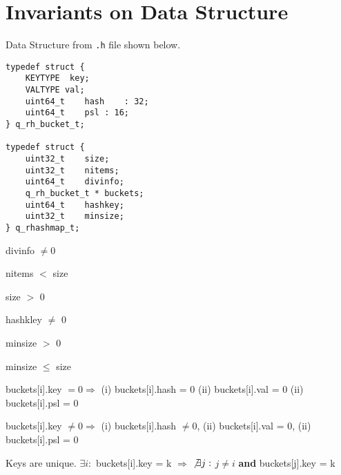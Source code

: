 \section{Invariants on Data Structure}
\label{invariants}
Data Structure from {\tt .h} file shown below.
\begin{verbatim}
typedef struct {
	KEYTYPE  key; 
	VALTYPE val;
	uint64_t	hash	: 32;
	uint64_t	psl	: 16;
} q_rh_bucket_t;

typedef struct {
	uint32_t	size;
	uint32_t	nitems;
	uint64_t	divinfo;
	q_rh_bucket_t *	buckets;
	uint64_t	hashkey;
	uint32_t	minsize;
} q_rhashmap_t;

\end{verbatim}

\begin{invariant}
divinfo \(\neq 0\)
\end{invariant}

\begin{invariant}
nitems \(<\) size
\end{invariant}

\begin{invariant}
size \(>\) 0
\end{invariant}

\begin{invariant}
hashkley \(\neq\) 0
\end{invariant}

\begin{invariant}
minsize \(>\) 0
\end{invariant}

\begin{invariant}
minsize \(\leq\) size
\end{invariant}

\begin{invariant}
buckets[i].key \(= 0 \Rightarrow\) 
(i) buckets[i].hash = 0
(ii) buckets[i].val = 0
(ii) buckets[i].psl = 0
\end{invariant}

\begin{invariant}
buckets[i].key \(\neq 0 \Rightarrow\) 
(i) buckets[i].hash \(\neq 0\),
(ii) buckets[i].val = 0,
(ii) buckets[i].psl = 0
\end{invariant}

\begin{invariant}
Keys are unique.
  \(\exists i:\)  buckets[i].key = k \(\Rightarrow\) 
  \(\not \exists j:\)  \( j \neq i \) {\bf and}  buckets[j].key = k 
\end{invariant}
